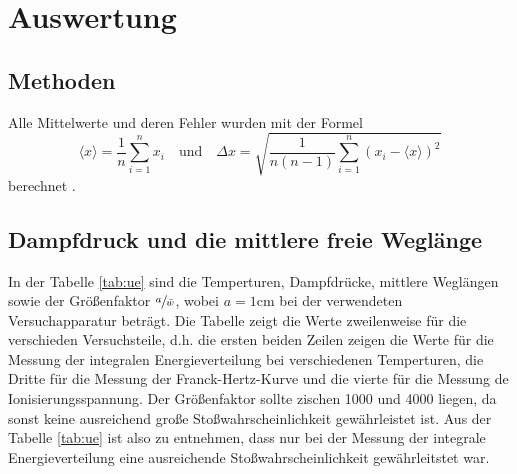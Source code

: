 \section{Auswertung}
\label{sec:Auswertung}


\subsection{Methoden}
Alle Mittelwerte und deren Fehler wurden mit der Formel
\begin{equation}
  \langle x \rangle = \frac{1}{n} \sum_{i=1} ^{n} x_i \quad \text{und} \quad
  \Delta x = \sqrt{\frac{1}{n(n-1)} \sum_{i=1}^n (x_i - \langle x \rangle )^2}
  \label{eqn:MW}
\end{equation}
berechnet \cite{Tipler}.
\subsection{Dampfdruck und die mittlere freie Weglänge}
In der Tabelle \ref{tab:ue} sind die Temperturen, Dampfdrücke, mittlere Weglängen
sowie der Größenfaktor $ \sfrac{a}{\bar{w}}$, wobei $a = 1 \si{\centi \meter}$ bei
der verwendeten Versuchapparatur beträgt. Die Tabelle zeigt die Werte zweilenweise für
die verschieden Versuchsteile, d.h. die ersten beiden Zeilen zeigen die Werte für
die Messung der integralen Energieverteilung bei verschiedenen Temperturen, die Dritte
für die Messung der Franck-Hertz-Kurve und die vierte für die Messung de Ionisierungsspannung.
Der Größenfaktor sollte zischen 1000 und
4000 liegen, da sonst keine ausreichend große Stoßwahrscheinlichkeit gewährleistet ist.
Aus der Tabelle \ref{tab:ue} ist also zu entnehmen, dass nur bei der Messung
der integrale Energieverteilung eine ausreichende
Stoßwahrscheinlichkeit gewährleitstet war.

